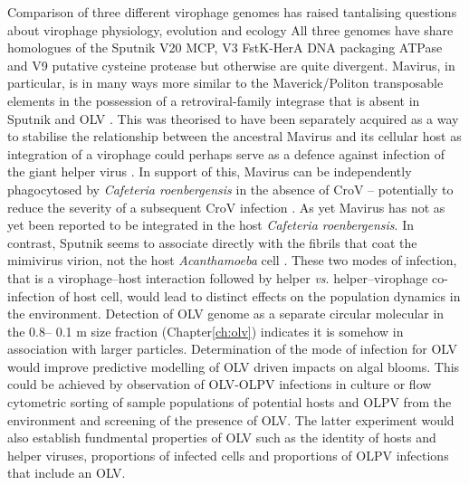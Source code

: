 Comparison of three different virophage genomes has raised tantalising questions about virophage physiology, evolution and ecology
All three genomes have share homologues of the Sputnik V20 \ac{MCP}, V3 FstK-HerA DNA packaging ATPase and V9 putative cysteine protease but otherwise are quite divergent.
Mavirus, in particular, is in many ways more similar to the Maverick/Politon transposable elements in the possession of a retroviral-family integrase that is absent in Sputnik and \ac{OLV} \cite{Fischer2011}.
This was theorised to have been separately acquired as a way to stabilise the relationship between the ancestral Mavirus and its cellular host as integration of a virophage could perhaps serve as a defence against infection of the giant helper virus \cite{Fischer2011}.
In support of this, Mavirus can be independently phagocytosed by \emph{Cafeteria roenbergensis} in the absence of \ac{CroV} -- potentially to reduce the severity of a subsequent \ac{CroV} infection \cite{Fischer2011}.
As yet Mavirus has not as yet been reported to be integrated in the host \emph{Cafeteria roenbergensis}.
In contrast, Sputnik seems to associate directly with the fibrils that coat the mimivirus virion, not the host \emph{Acanthamoeba} cell \cite{Boyer2011}.
These two modes of infection, that is a virophage--host interaction followed by helper \emph{vs}. helper--virophage co-infection of host cell, would lead to distinct effects on the population dynamics in the environment.
Detection of \ac{OLV} genome as a separate circular molecular in the 0.8-- 0.1 \textmu{}m size fraction (Chapter\ref{ch:olv}) indicates it is somehow in association with larger particles.
Determination of the mode of infection for \ac{OLV} would improve predictive modelling of \ac{OLV} driven impacts on algal blooms.
This could be achieved by observation of \ac{OLV}-\ac{OLPV} infections in culture or flow cytometric sorting of sample populations of potential hosts and \ac{OLPV} from the environment and screening of the presence of \ac{OLV}.
The latter experiment would also establish fundmental properties of \ac{OLV} such as the identity of hosts and helper viruses, proportions of infected cells and proportions of \ac{OLPV} infections that include an \ac{OLV}.
 
